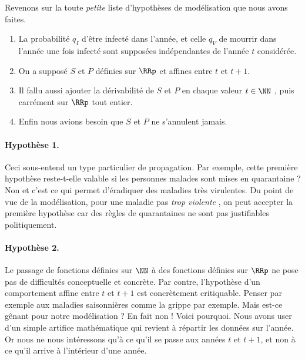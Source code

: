Revenons sur la toute \emph{\og petite \fg} liste d'hypothèses de modélisation que nous avons faites.

\begin{enumerate}
	\item La probabilité $q_I$ d'être infecté dans l'année, et celle $q_V$ de mourrir dans l'année une fois infecté sont supposées indépendantes de l'année $t$ considérée.

	\item On a supposé $S$ et $P$ définies sur $\RRp$ et affines entre $t$ et $t+1$.

	\item Il fallu aussi ajouter la dérivabilité de $S$ et $P$ en chaque valeur $t \in \NN$ , puis carrément sur $\RRp$ tout entier.

	\item Enfin nous avions besoin que $S$ et $P$ ne s'annulent jamais.
\end{enumerate}




\paragraph{Hypothèse 1.} Ceci sous-entend un type particulier de propagation. Par exemple, cette première hypothèse reste-t-elle valable si les personnes malades sont mises en quarantaine ? Non et c'est ce qui permet d'éradiquer des maladies très virulentes. Du point de vue de la modélisation, pour une maladie pas \emph{\og trop violente \fg} , on peut accepter la première hypothèse car des règles de quarantaines ne sont pas justifiables politiquement.




\paragraph{Hypothèse 2.} Le passage de fonctions définies sur $\NN$ à des fonctions définies sur $\RRp$ ne pose pas de difficultés conceptuelle et concrète. Par contre, l'hypothèse d'un comportement affine entre $t$ et $t+1$ est concrètement critiquable. Penser par exemple aux maladies saisonnières comme la grippe par exemple. Mais est-ce gênant pour notre modélisation ? En fait non ! Voici pourquoi. Nous avons user d'un simple artifice mathématique qui revient à répartir les données sur l'année. Or nous ne nous intéressons qu'à ce qu'il se passe aux années $t$ et $t+1$, et non à ce qu'il arrive à l'intérieur d'une année.


